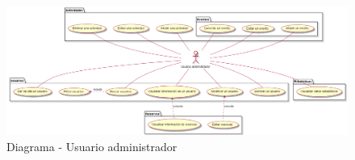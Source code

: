 \begin{figure}[H]
	\centering
	\includegraphics[width=1\linewidth]{5-AnalisisDelSistemaDeInformacion//Casos de uso//usuarioAdministrador/diagrama.png}
	\caption{Diagrama - Usuario administrador}
\end{figure}